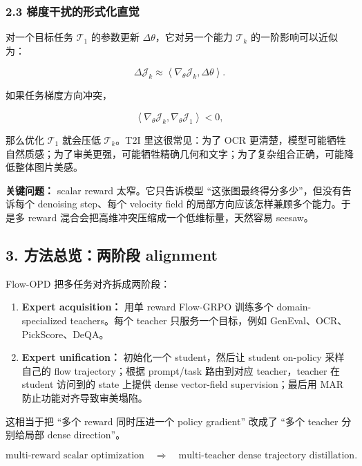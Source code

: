 \subsubsection{2.3 梯度干扰的形式化直觉}

对一个目标任务 $\mathcal{T}_1$ 的参数更新 $\Delta\theta$，它对另一个能力 $\mathcal{T}_k$ 的一阶影响可以近似为：

\[
\Delta \mathcal{J}_k
\approx
\left\langle
\nabla_\theta \mathcal{J}_k,
\Delta\theta
\right\rangle.
\]

如果任务梯度方向冲突，

\[
\left\langle
\nabla_\theta \mathcal{J}_k,
\nabla_\theta \mathcal{J}_1
\right\rangle < 0,
\]

那么优化 $\mathcal{T}_1$ 就会压低 $\mathcal{T}_k$。T2I 里这很常见：为了 OCR 更清楚，模型可能牺牲自然质感；为了审美更强，可能牺牲精确几何和文字；为了复杂组合正确，可能降低整体图片美感。

\begin{warnbox}
\textbf{关键问题：} scalar reward 太窄。它只告诉模型 ``这张图最终得分多少''，但没有告诉每个 denoising step、每个 velocity field 的局部方向应该怎样兼顾多个能力。于是多 reward 混合会把高维冲突压缩成一个低维标量，天然容易 seesaw。
\end{warnbox}

\subsection{3. 方法总览：两阶段 alignment}

Flow-OPD 把多任务对齐拆成两阶段：

\begin{enumerate}[leftmargin=1.5em]
  \item \textbf{Expert acquisition：} 用单 reward Flow-GRPO 训练多个 domain-specialized teachers。每个 teacher 只服务一个目标，例如 GenEval、OCR、PickScore、DeQA。
  \item \textbf{Expert unification：} 初始化一个 student，然后让 student on-policy 采样自己的 flow trajectory；根据 prompt/task 路由到对应 teacher，teacher 在 student 访问到的 state 上提供 dense vector-field supervision；最后用 MAR 防止功能对齐导致审美塌陷。
\end{enumerate}

这相当于把 ``多个 reward 同时压进一个 policy gradient'' 改成了 ``多个 teacher 分别给局部 dense direction''。

\[
\text{multi-reward scalar optimization}
\quad\Longrightarrow\quad
\text{multi-teacher dense trajectory distillation}.
\]

